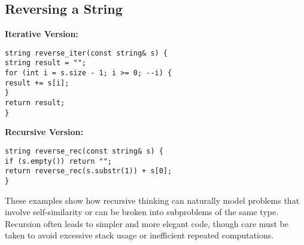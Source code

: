 \documentclass{article}
\begin{document}
\subsection{Reversing a String}

\textbf{Iterative Version:}
\begin{lstlisting}[style=cppstyle]
string reverse_iter(const string& s) {
string result = "";
for (int i = s.size - 1; i >= 0; --i) {
result += s[i];
}
return result;
}
\end{lstlisting}

\textbf{Recursive Version:}
\begin{lstlisting}[style=cppstyle]
string reverse_rec(const string& s) {
if (s.empty()) return "";
return reverse_rec(s.substr(1)) + s[0];
}
\end{lstlisting}



These examples show how recursive thinking can naturally model problems that involve self-similarity or can be broken into subproblems of the same type. Recursion often leads to simpler and more elegant code, though care must be taken to avoid excessive stack usage or inefficient repeated computations.
\end{document}
